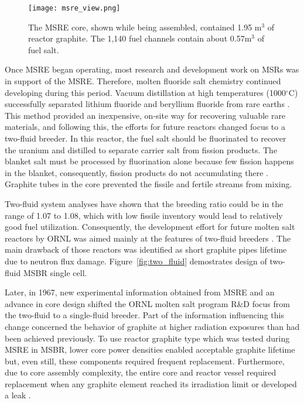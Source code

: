 \begin{figure}[htp!] %
  \centering
  \vspace{-0.3em}
  \texttt{[image: msre\_view.png]}
  \caption{The \gls{MSRE} core, shown while being assembled, contained 1.95 m$^3$ of reactor graphite. The 1,140 fuel channels contain about 0.57m$^3$ of fuel salt.}
  \vspace{-0.6em}
  \label{fig:msre}
\end{figure}
\FloatBarrier

Once \gls{MSRE} began operating, most research and development work on \glspl{MSR} was in support of the \gls{MSRE}. Therefore, molten fluoride salt chemistry continued developing during this period. Vacuum distillation at high temperatures (1000$^{\circ}$C) successfully separated lithium fluoride and beryllium fluoride from rare earths \cite{kelly_removal_1965}. This method provided an inexpensive, on-site way for recovering valuable rare materials, and following this, the efforts for future reactors changed focus to a two-fluid breeder. In this reactor, the fuel salt should be fluorinated to recover the uranium and distilled to separate carrier salt from fission products. The blanket salt must be processed by fluorination alone because few fission happens in the blanket, consequently, fission products do not accumulating there \cite{rosenthal_molten-salt_1970}. Graphite tubes in the core prevented the fissile and fertile streams from mixing.

Two-fluid system analyses have shown that the breeding ratio could be in the range of 1.07 to 1.08, which with low fissile inventory would lead to relatively good fuel utilization. Consequently, the development effort for future molten salt reactors by \gls{ORNL} was aimed mainly at the features of two-fluid breeders \cite{briggs_summary_1967}. The main drawback of those reactors was identified as short graphite pipes lifetime due to neutron flux damage. Figure~\ref{fig:two_fluid} demostrates design of two-fluid \gls{MSBR} single cell.

Later, in 1967, new experimental information obtained from \gls{MSRE} and an advance in core design shifted the \gls{ORNL} molten salt program R\&D focus from the two-fluid to a single-fluid breeder. Part of the information influencing this change concerned the behavior of graphite at higher radiation exposures than had been achieved previously. To use reactor graphite type which was tested during \gls{MSRE} in \gls{MSBR}, lower core power densities enabled acceptable graphite lifetime but, even still, these components required frequent replacement. Furthermore, due to core assembly complexity, the entire core and reactor vessel required replacement when any graphite element reached its irradiation limit or developed a leak \cite{rosenthal_molten-salt_1970}.

